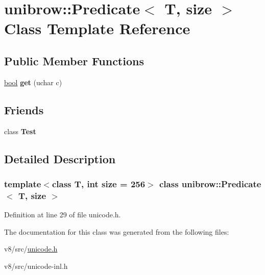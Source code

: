 \hypertarget{classunibrow_1_1Predicate}{}\section{unibrow\+:\+:Predicate$<$ T, size $>$ Class Template Reference}
\label{classunibrow_1_1Predicate}
\subsection*{Public Member Functions}
\begin{DoxyCompactItemize}
\item 
\mbox{\label{classunibrow_1_1Predicate_a64022f831257cbfd9ef81898a30ac6fe}} 
\mbox{\hyperlink{classbool}{bool}} {\bfseries get} (uchar c)
\end{DoxyCompactItemize}
\subsection*{Friends}
\begin{DoxyCompactItemize}
\item 
\mbox{\label{classunibrow_1_1Predicate_a5b78b1c2e1fa07ffed92da365593eaa4}} 
class {\bfseries Test}
\end{DoxyCompactItemize}


\subsection{Detailed Description}
\subsubsection*{template$<$class T, int size = 256$>$\newline
class unibrow\+::\+Predicate$<$ T, size $>$}



Definition at line 29 of file unicode.\+h.



The documentation for this class was generated from the following files\+:\begin{DoxyCompactItemize}
\item 
v8/src/\mbox{\hyperlink{unicode_8h}{unicode.\+h}}\item 
v8/src/unicode-\/inl.\+h\end{DoxyCompactItemize}
